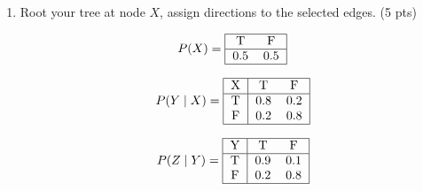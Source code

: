 \documentclass[a4paper]{article}
\theoremstyle{definition}
\newenvironment{soln}{
	\leavevmode\color{blue}\ignorespaces
}{}
\begin{document}
\begin{enumerate}
	\item Root your tree at node $X$, assign directions to the selected edges. (5 pts)
	
	\begin{soln}
		\begin{center}
		\end{center}
		\[
		P(X) =
		\begin{tabular}{|c  c|}
			\hline
			T & F \\
			\hline
			0.5 & 0.5 \\
			\hline
		\end{tabular}
		\]
		
		\[
		P(Y \mid X) =
		\begin{tabular}{| c | c  c |}
			\hline
			X & T & F \\
			\hline
			T & 0.8 & 0.2 \\
			F & 0.2 & 0.8 \\
			\hline
		\end{tabular}
		\]
		
		\[
		P(Z \mid Y) =
		\begin{tabular}{| c | c  c |}
			\hline
			Y & T & F \\
			\hline
			T & 0.9 & 0.1 \\
			F & 0.2 & 0.8 \\
			\hline
		\end{tabular}
		\]
	\end{soln}
	
\end{enumerate}

	
	
\end{document}
